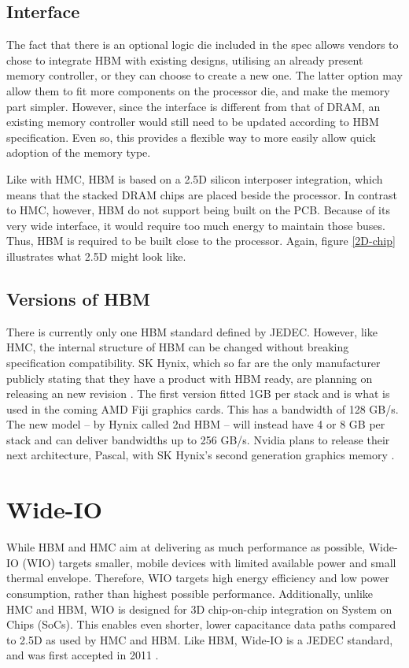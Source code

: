 \subsection{Interface}
The fact that there is an optional logic die included in the spec allows vendors to chose to integrate HBM with existing designs, utilising an already present memory controller, or they can choose to create a new one. The latter option may allow them to fit more components on the processor die, and make the memory part simpler. However, since the interface is different from that of DRAM, an existing memory controller would still need to be updated according to HBM specification. Even so, this provides a flexible way to more easily allow quick adoption of the memory type. 
\bigskip

Like with HMC, HBM is based on a 2.5D silicon interposer integration, which means that the stacked DRAM chips are placed beside the processor. In contrast to HMC, however, HBM do not support being built on the PCB. Because of its very wide interface, it would require too much energy to maintain those buses. Thus, HBM is required to be built close to the processor. Again, figure \ref{2D-chip} illustrates what 2.5D might look like. 

\subsection{Versions of HBM}
There is currently only one HBM standard defined by JEDEC. However, like HMC, the internal structure of HBM can be changed without breaking specification compatibility. SK Hynix, which so far are the only manufacturer publicly stating that they have a product with HBM ready, are planning on releasing an new revision \cite{yongshinkim2014}. The first version fitted 1GB per stack and is what is used in the coming AMD Fiji graphics cards. This has a bandwidth of 128 GB/s. The new model -- by Hynix called 2nd HBM -- will instead have 4 or 8 GB per stack and can deliver bandwidths up to 256 GB/s. Nvidia plans to release their next architecture, Pascal, with SK Hynix's second generation graphics memory \cite{ryansmith2015}. 


\section{Wide-IO}
While HBM and HMC aim at delivering as much performance as possible, Wide-IO (WIO) targets smaller, mobile devices with limited available power and small thermal envelope. Therefore, WIO targets high energy efficiency and low power consumption, rather than highest possible performance. Additionally, unlike HMC and HBM, WIO is designed for 3D chip-on-chip integration on System on Chips (SoCs). This enables even shorter, lower capacitance data paths compared to 2.5D as used by HMC and HBM. Like HBM, Wide-IO is a JEDEC standard, and was first accepted in 2011 \cite{standard2011wide}. 

